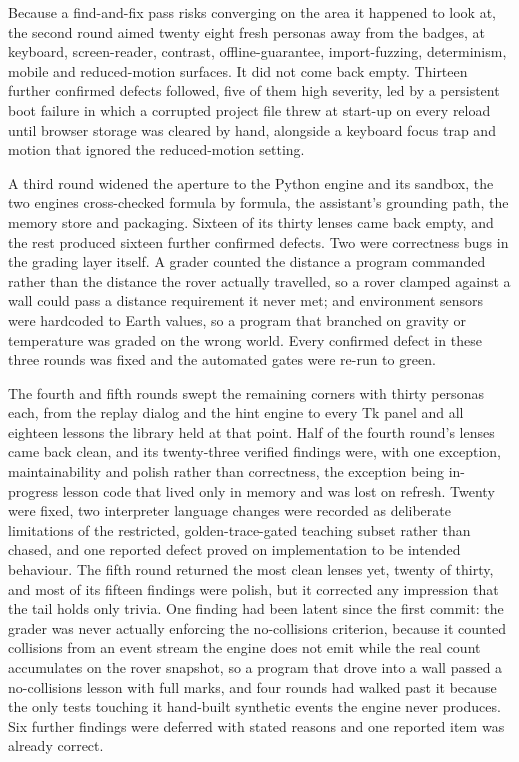 \documentclass[11pt,a4paper]{report}
\begin{document}
Because a find-and-fix pass risks converging on the area it happened to look at, the second round aimed twenty eight fresh personas away from the badges, at keyboard, screen-reader, contrast, offline-guarantee, import-fuzzing, determinism, mobile and reduced-motion surfaces. It did not come back empty. Thirteen further confirmed defects followed, five of them high severity, led by a persistent boot failure in which a corrupted project file threw at start-up on every reload until browser storage was cleared by hand, alongside a keyboard focus trap and motion that ignored the reduced-motion setting.

A third round widened the aperture to the Python engine and its sandbox, the two engines cross-checked formula by formula, the assistant's grounding path, the memory store and packaging. Sixteen of its thirty lenses came back empty, and the rest produced sixteen further confirmed defects. Two were correctness bugs in the grading layer itself. A grader counted the distance a program commanded rather than the distance the rover actually travelled, so a rover clamped against a wall could pass a distance requirement it never met; and environment sensors were hardcoded to Earth values, so a program that branched on gravity or temperature was graded on the wrong world. Every confirmed defect in these three rounds was fixed and the automated gates were re-run to green.

The fourth and fifth rounds swept the remaining corners with thirty personas each, from the replay dialog and the hint engine to every Tk panel and all eighteen lessons the library held at that point. Half of the fourth round's lenses came back clean, and its twenty-three verified findings were, with one exception, maintainability and polish rather than correctness, the exception being in-progress lesson code that lived only in memory and was lost on refresh. Twenty were fixed, two interpreter language changes were recorded as deliberate limitations of the restricted, golden-trace-gated teaching subset rather than chased, and one reported defect proved on implementation to be intended behaviour. The fifth round returned the most clean lenses yet, twenty of thirty, and most of its fifteen findings were polish, but it corrected any impression that the tail holds only trivia. One finding had been latent since the first commit: the grader was never actually enforcing the no-collisions criterion, because it counted collisions from an event stream the engine does not emit while the real count accumulates on the rover snapshot, so a program that drove into a wall passed a no-collisions lesson with full marks, and four rounds had walked past it because the only tests touching it hand-built synthetic events the engine never produces. Six further findings were deferred with stated reasons and one reported item was already correct.
\end{document}
